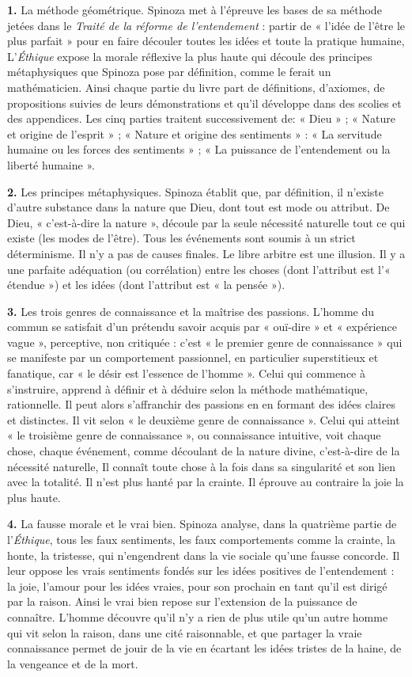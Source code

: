 {\bf 1.} La méthode géométrique. Spinoza
met à l'épreuve les bases de sa méthode
jetées dans le {\it Traité de la réforme de
l’entendement} : partir de « l’idée de l'être
le plus parfait » pour en faire découler
toutes les idées et toute la pratique
humaine, L'{\it Éthique} expose la morale
réflexive la plus haute qui découle des
principes métaphysiques que Spinoza
pose par définition, comme le ferait un
mathématicien. Ainsi chaque partie du
livre part de définitions, d’axiomes, de
propositions suivies de leurs démonstrations et qu'il développe dans des scolies
et des appendices. Les cinq parties
traitent successivement de: « Dieu » ;
« Nature et origine de l'esprit » ; « Nature
et origine des sentiments » : « La servitude humaine ou les forces des sentiments » ; « La puissance de l’entendement ou la liberté humaine ».

{\bf 2.} Les principes métaphysiques. Spinoza établit que, par définition, il
n'existe d'autre substance dans la
nature que Dieu, dont tout est mode ou
attribut. De Dieu, « c'est-à-dire la
nature », découle par la seule nécessité
naturelle tout ce qui existe (les modes
de l'être). Tous les événements sont soumis à un strict déterminisme. Il n'y a pas
de causes finales. Le libre arbitre est
une illusion. Il y a une parfaite adéquation (ou corrélation) entre les choses
(dont l'attribut est l'« étendue ») et les
idées (dont l’attribut est « la pensée »).

{\bf 3.} Les trois genres de connaissance et la
maîtrise des passions. L'homme du
commun se satisfait d’un prétendu
savoir acquis par « ouï-dire » et « expérience vague », perceptive, non critiquée : c’est « le premier genre de
connaissance » qui se manifeste par un
comportement passionnel, en particulier
superstitieux et fanatique, car « le désir
est l'essence de l’homme ». Celui qui
commence à s'instruire, apprend à définir et à déduire selon la méthode mathématique, rationnelle. Il peut alors s’affranchir des passions en en formant des
idées claires et distinctes. Il vit selon « le
deuxième genre de connaissance ».
Celui qui atteint « le troisième genre de
connaissance », ou connaissance intuitive, voit chaque chose, chaque événement, comme découlant de la nature
divine, c'est-à-dire de la nécessité naturelle, Il connaît toute chose à la fois dans
sa singularité et son lien avec la totalité.
Il n’est plus hanté par la crainte. Il
éprouve au contraire la joie la plus
haute.

{\bf 4.} La fausse morale et le vrai bien. Spinoza analyse, dans la quatrième partie
de l’{\it Éthique}, tous les faux sentiments,
les faux comportements comme la
crainte, la honte, la tristesse, qui n’engendrent dans la vie sociale qu'une
fausse concorde. Il leur oppose les vrais
sentiments fondés sur les idées positives
de l'entendement : la joie, l'amour pour
les idées vraies, pour son prochain en
tant qu'il est dirigé par la raison. Ainsi le
vrai bien repose sur l'extension de la
puissance de connaître. L'homme
découvre qu'il n'y a rien de plus utile
qu'un autre homme qui vit selon la raison, dans une cité raisonnable, et que
partager la vraie connaissance permet de
jouir de la vie en écartant les idées tristes
de la haine, de la vengeance et de la
mort.

